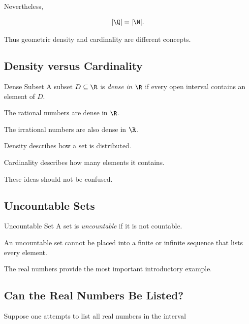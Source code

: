 Nevertheless,

\[ |\Q|=|\N|. \]

Thus geometric density and cardinality are different concepts.

\subsection{Density versus Cardinality}
\label{subsec:density-vs-cardinality}

\begin{definitionbox}{Dense Subset}
A subset \(D\subseteq\R\) is \emph{dense in \(\R\)} if every open interval
contains an element of \(D\).
\end{definitionbox}

The rational numbers are dense in \(\R\).

The irrational numbers are also dense in \(\R\).

Density describes how a set is distributed.

Cardinality describes how many elements it contains.

These ideas should not be confused.

\subsection{Uncountable Sets}
\label{subsec:uncountable-sets}

\begin{definitionbox}{Uncountable Set}
A set is \emph{uncountable} if it is not countable.
\end{definitionbox}

An uncountable set cannot be placed into a finite or infinite sequence that
lists every element.

The real numbers provide the most important introductory example.

\subsection{Can the Real Numbers Be Listed?}
\label{subsec:can-reals-be-listed}

Suppose one attempts to list all real numbers in the interval


